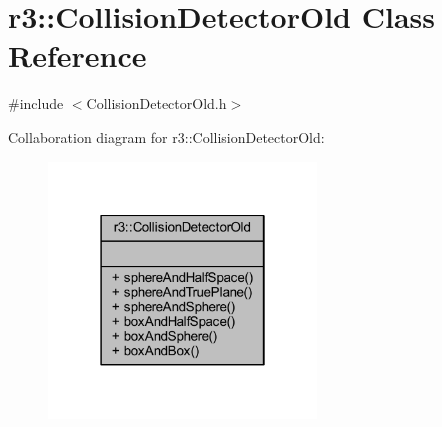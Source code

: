 \hypertarget{classr3_1_1_collision_detector_old}{}\section{r3\+:\+:Collision\+Detector\+Old Class Reference}
\label{classr3_1_1_collision_detector_old}


{\ttfamily \#include $<$Collision\+Detector\+Old.\+h$>$}



Collaboration diagram for r3\+:\+:Collision\+Detector\+Old\+:\nopagebreak
\begin{figure}[H]
\begin{center}
\leavevmode
\includegraphics[width=202pt]{classr3_1_1_collision_detector_old__coll__graph}
\end{center}
\end{figure}
